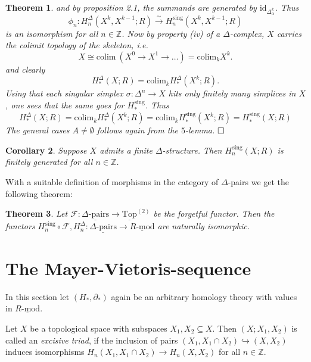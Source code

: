 \documentclass[11pt]{book}
\numberwithin{dummy}{section}
\newtheorem{theorem}{Theorem}[section]
\newtheorem{corollary}[theorem]{Corollary}
\theoremstyle{nonumberbreak}
\newenvironment{defin}[1][]{\ifthenelse{\equal{#1}{}}{\definition}{\definition[#1]}\rm}{\enddefinition}
\newenvironment{pr}[1][]{\ifthenelse{\equal{#1}{}}{\proof}{\proof[#1]}\rm}{\endproof}
\newcommand{\Rmod}{\underline{R\textrm{-}\mathrm{mod}}}
\newcommand{\toptwo}{\underline{\mathrm{Top}}^{(2)}}
\newcommand{\F}{\mathcal{F}}
\newcommand{\la}{\longrightarrow}
\newcommand{\id}{\mathrm{id}}
\newcommand{\Z}{\mathbb{Z}}
\newcommand{\Hs}{H^{\hspace{1pt}\mathrm{sing}}}
\begin{document}
\begin{spacing}{1.4}
\begin{theorem}
\begin{pr}
and by proposition 2.1, the summands are generated by $\id_{\Delta_{\alpha}^k}$. Thus 
$$\phi_n:H^{\Delta}_n(X^k, X^{k-1};R) \overset{\sim}{\la} \Hs_n(X^k,X^{k-1};R)$$
is an isomorphism for all $n \in \Z$. Now by property (iv) of a $\Delta$-complex, $X$ carries the colimit topology of the skeleton, i.e. 
$$X \cong \mathrm{colim} \ \left( X^{0} \la X^1 \la \ldots\right) = \mathrm{colim}_{k} X^k.$$
and clearly
$$H_*^{\Delta}(X;R) = \mathrm{colim}_k H_*^{\Delta}(X^k;R).$$
Using that each singular simplex $\sigma: \Delta^n \la X$ hits only finitely many simplices in $X$, one sees that the same goes for $\Hs_*$. Thus 
$$H^{\Delta}_*(X;R) = \mathrm{colim}_k H_*^{\Delta}(X^k;R) = \mathrm{colim}_k  H_*^{\mathrm{sing}} (X^k;R) = \Hs_*(X;R)$$
The general cases $A \neq \emptyset$ follows again from the $5$-lemma. $\hfill \Box$

\end{pr}

\end{theorem}



\begin{corollary}
Suppose $X$ admits a finite $\Delta$-structure. Then $\Hs_n(X;R)$ is finitely generated for all $n \in \Z$. 

\end{corollary}

With a suitable definition of morphisms in the category of $\Delta$-pairs we get the following theorem:

\begin{theorem}
Let $\F: \underline{\Delta\textrm{-}\mathrm{pairs}} \la \toptwo$ be the forgetful functor. Then the functors $\Hs_n \circ \F, H^{\Delta}_n:  \underline{\Delta\textrm{-}\mathrm{pairs}} \la \Rmod$ are naturally isomorphic.
\end{theorem}











\section{The Mayer-Vietoris-sequence} %



In this section let $(H_*, \partial_*)$ again be an arbitrary homology theory with values in $\Rmod$.

\begin{defin}
Let $X$ be a topological space with subspaces $X_1,X_2 \subseteq X$. Then $(X;X_1,X_2)$ is called an \textit{excisive triad}, if the inclusion of pairs $(X_1, X_1 \cap X_2) \hookrightarrow (X,X_2)$ induces isomorphisms $H_n(X_1, X_1 \cap X_2) \la H_n(X,X_2)$ for all $n \in \Z$. 


\end{defin}
\end{spacing}
\end{document}
